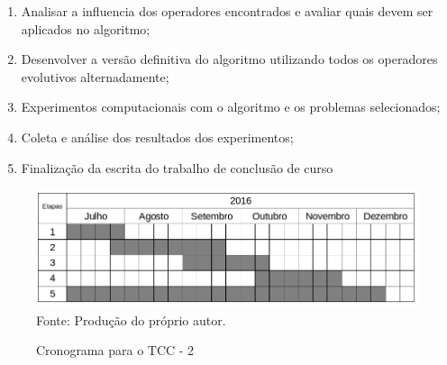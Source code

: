 \begin{enumerate}
\item Analisar a influencia dos operadores encontrados e avaliar quais devem ser aplicados no algoritmo;
\item Desenvolver a versão definitiva do algoritmo utilizando todos os operadores evolutivos alternadamente;
\item Experimentos computacionais com o algoritmo e os problemas selecionados;
\item Coleta e análise dos resultados dos experimentos; 
\item Finalização da escrita do trabalho de conclusão de curso
\end{enumerate}

\begin{figure}[!htb]
	\caption{Cronograma para o TCC - 2}
	\centering
	\includegraphics[scale=0.5]{images/cronograma.png}
	\label{fig:cronograma}{\\Fonte: Produção do próprio autor.}
\end{figure}

